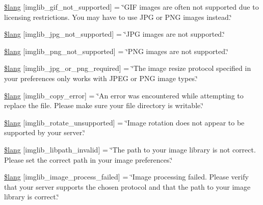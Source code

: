 \begin{DoxyCompactItemize}
\hyperlink{system_2language_2english_2imglib__lang_8php_a235a59a6660145fc136b3933b5b10675}{\$lang} \mbox{[}\textquotesingle{}imglib\+\_\+gif\+\_\+not\+\_\+supported\textquotesingle{}\mbox{]} = \char`\"{}G\+IF images are often not supported due to licensing restrictions. You may have to use J\+PG or P\+NG images instead.\char`\"{}
\item 
\hyperlink{system_2language_2english_2imglib__lang_8php_a4acdc927c172bab1370b2897c667c552}{\$lang} \mbox{[}\textquotesingle{}imglib\+\_\+jpg\+\_\+not\+\_\+supported\textquotesingle{}\mbox{]} = \char`\"{}J\+PG images are not supported.\char`\"{}
\item 
\hyperlink{system_2language_2english_2imglib__lang_8php_a0b7ea2e2fbd03eb72fe9d969adb643dd}{\$lang} \mbox{[}\textquotesingle{}imglib\+\_\+png\+\_\+not\+\_\+supported\textquotesingle{}\mbox{]} = \char`\"{}P\+NG images are not supported.\char`\"{}
\item 
\hyperlink{system_2language_2english_2imglib__lang_8php_a2878e2b878871cd8010970f865d70e71}{\$lang} \mbox{[}\textquotesingle{}imglib\+\_\+jpg\+\_\+or\+\_\+png\+\_\+required\textquotesingle{}\mbox{]} = \char`\"{}The image resize protocol specified in your preferences only works with J\+P\+EG or P\+NG image types.\char`\"{}
\item 
\hyperlink{system_2language_2english_2imglib__lang_8php_a012b6a0d2b3a8ef934e8783d2fbd6535}{\$lang} \mbox{[}\textquotesingle{}imglib\+\_\+copy\+\_\+error\textquotesingle{}\mbox{]} = \char`\"{}An error was encountered while attempting to replace the file. Please make sure your file directory is writable.\char`\"{}
\item 
\hyperlink{system_2language_2english_2imglib__lang_8php_ab1c77c6b58fc5bf8e979ab4237ec87e7}{\$lang} \mbox{[}\textquotesingle{}imglib\+\_\+rotate\+\_\+unsupported\textquotesingle{}\mbox{]} = \char`\"{}Image rotation does not appear to be supported by your server.\char`\"{}
\item 
\hyperlink{system_2language_2english_2imglib__lang_8php_a8f190c17a02ca89334c8bf0a04333f65}{\$lang} \mbox{[}\textquotesingle{}imglib\+\_\+libpath\+\_\+invalid\textquotesingle{}\mbox{]} = \char`\"{}The path to your image library is not correct. Please set the correct path in your image preferences.\char`\"{}
\item 
\hyperlink{system_2language_2english_2imglib__lang_8php_a9ac6659eb97dd12e5c714cc9635cf22e}{\$lang} \mbox{[}\textquotesingle{}imglib\+\_\+image\+\_\+process\+\_\+failed\textquotesingle{}\mbox{]} = \char`\"{}Image processing failed. Please verify that your server supports the chosen protocol and that the path to your image library is correct.\char`\"{}

\end{DoxyCompactItemize}
